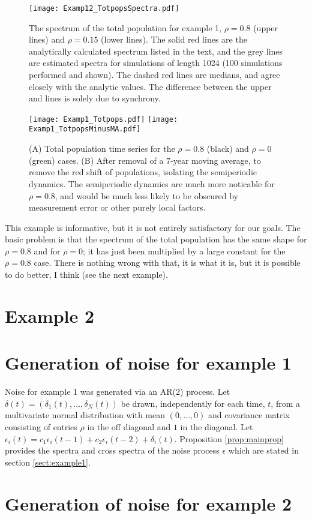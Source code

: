 \documentclass[letterpaper,11pt]{article}
\begin{document}
\begin{figure}
\texttt{[image: Examp12\_TotpopsSpectra.pdf]}
\caption{The spectrum of the total population for example 1, $\rho=0.8$ (upper lines) and $\rho=0.15$ (lower lines). The solid red lines are the analytically calculated spectrum listed in the text, and the grey lines are estimated spectra for simulations of length 1024 (100 simulations performed and shown). The dashed red lines are medians, and 
agree closely with the analytic values. The difference between the upper and lines is solely due to synchrony.}\label{fig:Stotexample1}
\end{figure}

\begin{figure}
\texttt{[image: Examp1\_Totpops.pdf]}
\texttt{[image: Examp1\_TotpopsMinusMA.pdf]}
\caption{(A) Total population time series for the $\rho=0.8$ (black) and
$\rho=0$ (green) cases. (B) After removal of a $7$-year moving average,
to remove the red shift of populations, isolating the semiperiodic dynamics.
The semiperiodic dynamics are much more noticable for $\rho=0.8$, and would
be much less likely to be obscured by measurement error or other purely local
factors.}
\label{fig:totpopstretches}
\end{figure}

This example is informative, but it is not entirely satisfactory for our goals.
The basic problem is that the spectrum of the total population has the same shape
for $\rho=0.8$ and for $\rho=0$; it has just been multiplied by a large constant 
for the $\rho=0.8$ case. There is nothing wrong with that, it is what it is, but it
is possible to do better, I think (see the next example).
 
\section{Example 2}


\section{Generation of noise for example 1}\label{sec:noise1}

Noise for example 1 was generated via an AR(2) process. Let 
$\delta(t) = (\delta_1(t),\ldots,\delta_N(t))$ be drawn, independently for 
each time, $t$, from a multivariate normal distribution with mean $(0,\ldots,0)$
and covariance matrix consisting of entries $\rho$ in the off diagonal and $1$
in the diagonal. Let $\epsilon_i(t)=c_1 \epsilon_i(t-1) + c_2 \epsilon_i(t-2)+\delta_i(t)$. Proposition \ref{prop:mainprop} provides the spectra
and cross spectra of the noise process $\epsilon$ which are stated in section
\ref{sect:example1}.

\section{Generation of noise for example 2}





\end{document}

